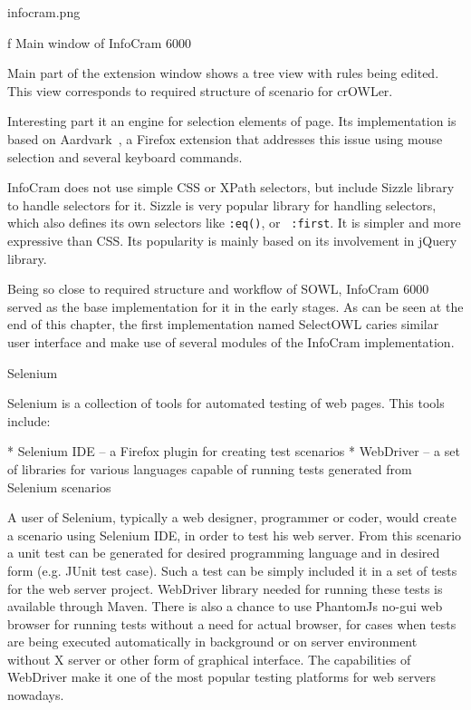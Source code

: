 \midinsert
\picw=7cm \cinspic infocram.png
\caption/f Main window of InfoCram 6000
\endinsert

Main part of the extension window shows a tree view with rules being edited.
This view corresponds to required structure of scenario for crOWLer. 

Interesting part it an engine for selection elements of page. Its
implementation is based on
Aardvark~, a
Firefox extension that addresses this issue using mouse selection and several
keyboard commands. 

InfoCram does not use simple CSS or XPath selectors, but include Sizzle library
to handle selectors for it. Sizzle is very popular library for handling
selectors, which also defines its own selectors like {\tt :eq()}, or {\tt
:first}. It is simpler and more expressive than CSS. Its popularity is 
mainly based on its involvement in jQuery library. 

Being so close to required structure and workflow of SOWL, InfoCram 6000 served
as the base implementation for it in the early stages. As can be seen at the end 
of this chapter, the first implementation named SelectOWL caries similar user
interface and make use of several modules of the InfoCram implementation. 


\secc Selenium

Selenium is a collection of tools for automated testing of web pages. This tools include: 

\begitems
  * Selenium IDE -- a Firefox plugin for creating test scenarios
  * WebDriver -- a set of libraries for various languages capable of running
    tests generated from Selenium scenarios
\enditems

A user of Selenium, typically a web designer, programmer or coder, would create
a scenario using Selenium IDE, in order to test his web server. From this
scenario a unit test can be generated for desired programming language and in
desired form (e.g. JUnit test case). Such a test can be simply included it in a
set of tests for the web server project. WebDriver library needed for running
these tests is available through Maven. There is also a chance to use PhantomJs
no-gui web browser for running tests without a need for actual browser, for
cases when tests are being executed automatically in background or on server
environment without X server or other form of graphical interface. The
capabilities of WebDriver make it one of the most popular testing platforms for
web servers nowadays. 

